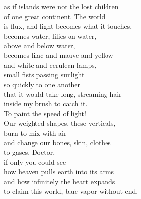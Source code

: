 \begin{Parallel}{0.48\textwidth}{0.48\textwidth}
{as if islands were not the lost children\\
of one great continent. The world\\
is flux, and light becomes what it touches,\\
becomes water, lilies on water,\\
above and below water,\\
becomes lilac and mauve and yellow\\
and white and cerulean lamps,\\
small fists passing sunlight\\
so quickly to one another\\
that it would take long, streaming hair\\
inside my brush to catch it.\\
To paint the speed of light!\\
Our weighted shapes, these verticals,\\
burn to mix with air\\
and change our bones, skin, clothes\\
to gases.  Doctor,\\
if only you could see\\
how heaven pulls earth into its arms\\
and how infinitely the heart expands\\
to claim this world, blue vapor without end.}
\ParallelPar
\end{Parallel}